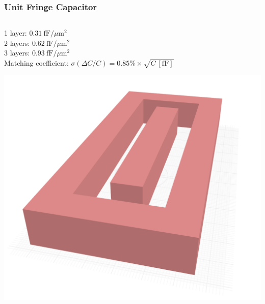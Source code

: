 \documentclass[aspectratio=169]{beamer}
\begin{document}
\begin{frame}
  \frametitle{Unit Fringe Capacitor}

  \begin{columns}
    \begin{column}{0.5\textwidth}
      1 layer: $0.31~\mathrm{fF}/\mu\mathrm{m}^2$ \\
      2 layers: $0.62~\mathrm{fF}/\mu\mathrm{m}^2$ \\
      3 layers: $0.93~\mathrm{fF}/\mu\mathrm{m}^2$ \\
      Matching coefficient: $\sigma(\Delta C/C) = 0.85\% \times \sqrt{C~[\mathrm{fF}]}$
      \vspace{2em}
      \begin{center}
        \includegraphics[width=\linewidth,height=0.4\textheight,keepaspectratio]{../images/cdac_unit_cell_3d.png}
      \end{center}
    \end{column}


\end{columns}
\end{frame}
\end{document}
